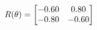 \documentclass[preview]{standalone}
\begin{document}
\begin{align*}
\special{dvisvgm:raw <g id='unique000'>}R(\theta) = \begin{bmatrix}-0.60 & 0.80\\-0.80 & -0.60\end{bmatrix}\special{dvisvgm:raw </g>}
\end{align*}
\end{document}
